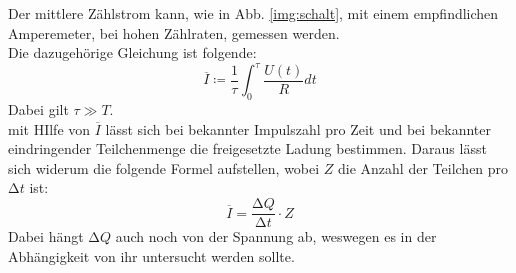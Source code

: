 \noindent
Der mittlere Zählstrom kann, wie in Abb. \ref{img:schalt}, mit einem empfindlichen Amperemeter, bei hohen Zählraten, gemessen werden.\\
Die dazugehörige Gleichung ist folgende:
\begin{equation*}
    \overline{I} \coloneq \frac{1}{\tau} \int_0^\tau \frac{U(t)}{R} dt
\end{equation*}
Dabei gilt $\tau \gg T$.\\
mit HIlfe von $ \overline{I} $ lässt sich bei bekannter Impulszahl pro Zeit und bei bekannter eindringender Teilchenmenge die freigesetzte Ladung bestimmen.
Daraus lässt sich widerum die folgende Formel aufstellen, wobei $Z$ die Anzahl der Teilchen pro $\increment t$ ist:
\begin{equation*}
    \overline{I} =\frac{\increment Q}{\increment t} \cdot Z
\end{equation*}
Dabei hängt $\increment Q$ auch noch von der Spannung ab, weswegen es in der Abhängigkeit von ihr untersucht werden sollte.